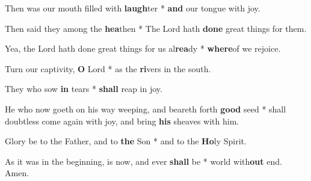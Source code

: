 \begin{multicols}{2}
	Then was our mouth filled with \textbf{laugh}ter * \textbf{and} our tongue with joy.
	
	Then said they among the \textbf{hea}then * The Lord hath \textbf{done} great things for them.
	
	Yea, the Lord hath done great things for us al\textbf{rea}dy * \textbf{where}of we rejoice.
	
	Turn our captivity, \textbf{O} Lord * as the \textbf{ri}vers in the south.
	
	They who sow \textbf{in} tears * \textbf{shall} reap in joy.
	
	He who now goeth on his way weeping, and beareth forth \textbf{good} seed * shall doubtless come again with joy, and bring \textbf{his} sheaves with him.
	
	Glory be to the Father, and to \textbf{the} Son * and to the \textbf{Ho}ly Spirit.
	
	As it was in the beginning, is now, and ever \textbf{shall} be * world with\textbf{out} end. Amen.
\end{multicols}